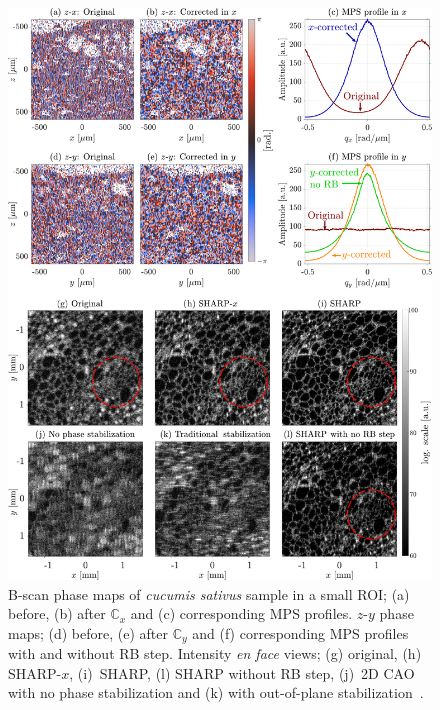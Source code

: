 \begin{figure}[htb!]
	\centering
	\includegraphics[width=.98\textwidth]{Figures/SHARP/SHARP_Cucumber.pdf}
	\caption[Proof of concept experimental validation of SHARP in a \textit{cucumis sativus} sample tomogram acquired with a SSOCT system.]{B-scan phase maps of \textit{cucumis sativus} sample in a small ROI; (a) before, (b) after $\mathbb{C}_x$ and (c) corresponding MPS profiles. $z$-$y$ phase maps; (d) before, (e) after $\mathbb{C}_y$ and (f) corresponding MPS profiles with and without RB step. Intensity \textit{en face} views; (g) original, (h) SHARP-$x$, (i)~SHARP, (l) SHARP without RB step, (j)~2D CAO with no phase stabilization and (k) with out-of-plane stabilization~\cite{Shemonski2014_Threedimensional}.}
	\label{fig:SHARP_Cucumber}
\end{figure}

